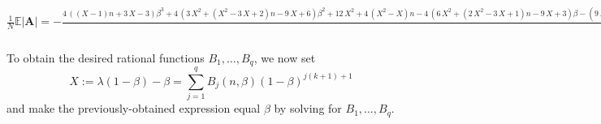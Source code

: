 \documentclass[11pt]{article}
\begin{document}
    
    $\displaystyle \frac{1}{N}\mathbb{E}|\mathbf{A}| = -\frac{4 \, {\left({\left(X - 1\right)} n + 3 \, X - 3\right)} β^{3} + 4 \, {\left(3 \, X^{2} + {\left(X^{2} - 3 \, X + 2\right)} n - 9 \, X + 6\right)} β^{2} + 12 \, X^{2} + 4 \, {\left(X^{2} - X\right)} n - 4 \, {\left(6 \, X^{2} + {\left(2 \, X^{2} - 3 \, X + 1\right)} n - 9 \, X + 3\right)} β - {\left(9 \, X^{5} + 15 \, X^{4} - {\left(X^{5} + X^{4} - 2 \, X^{3}\right)} n^{3} + {\left({\left(X^{2} - X\right)} n^{3} + {\left(5 \, X^{2} - 7 \, X + 2\right)} n^{2} - 9 \, X^{2} + {\left(3 \, X^{2} - 7 \, X + 4\right)} n + 15 \, X - 6\right)} β^{3} - 32 \, X^{3} - {\left(5 \, X^{5} - X^{4} - 12 \, X^{3} + 8 \, X^{2}\right)} n^{2} + {\left({\left(X^{3} - 3 \, X^{2} + 2 \, X\right)} n^{3} - 21 \, X^{3} + {\left(X^{3} - 17 \, X^{2} + 20 \, X - 4\right)} n^{2} + 41 \, X^{2} - {\left(13 \, X^{3} + 5 \, X^{2} - 34 \, X + 16\right)} n - 24 \, X + 4\right)} β^{2} - {\left(3 \, X^{5} - 17 \, X^{4} - 2 \, X^{3} + 24 \, X^{2} - 8 \, X\right)} n - {\left(3 \, X^{4} + {\left(X^{4} + 3 \, X^{3} - 4 \, X^{2}\right)} n^{3} - 41 \, X^{3} + 3 \, {\left(3 \, X^{4} + 3 \, X^{3} - 10 \, X^{2} + 4 \, X\right)} n^{2} + 50 \, X^{2} + {\left(19 \, X^{4} - 19 \, X^{3} - 32 \, X^{2} + 40 \, X - 8\right)} n - 4 \, X - 8\right)} β + 8 \, X\right)} γ - 12 \, X}{4 \, {\left({\left(n + 3\right)} β^{2} - 2 \, {\left(n + 3\right)} β + n + 3\right)}}$

    
    To obtain the desired rational functions \(B_1, \ldots, B_q\), we now
set
\[X := \lambda(1-\beta) - \beta = \sum_{j=1}^q B_j(n,\beta) (1-\beta)^{j(k+1) + 1}\]
and make the previously-obtained expression equal \(\beta\) by solving
for \(B_1, \ldots, B_q\).
\end{document}

